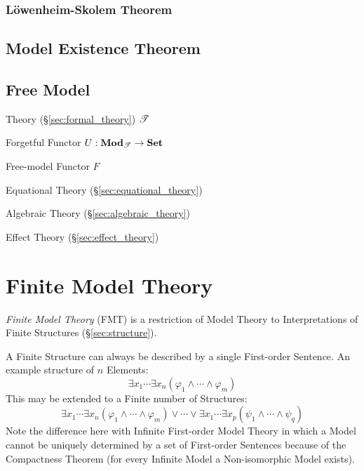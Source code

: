 \subsubsection{L\"owenheim-Skolem Theorem}\label{sec:lowenheim_skolem}



\subsection{Model Existence Theorem}\label{sec:model_existence}

\subsection{Free Model}\label{sec:free_model}

Theory (\S\ref{sec:formal_theory}) $\mathscr{T}$

Forgetful Functor $U : \mathbf{Mod}_\mathscr{T} \rightarrow \mathbf{Set}$

Free-model Functor $F$

Equational Theory (\S\ref{sec:equational_theory})

Algebraic Theory (\S\ref{sec:algebraic_theory})

Effect Theory (\S\ref{sec:effect_theory})



\section{Finite Model Theory}\label{sec:finite_model}

\emph{Finite Model Theory} (FMT) is a restriction of Model Theory to
Interpretations of Finite Structures (\S\ref{sec:structure}).

A Finite Structure can always be described by a single First-order
Sentence. An example structure of $n$ Elements:
\[
  \exists x_1 \cdots \exists x_n ( \varphi_1 \wedge \cdots \wedge
  \varphi_m )
\]
This may be extended to a Finite number of Structures:
\[
  \exists x_1 \cdots \exists x_n ( \varphi_1 \wedge \cdots \wedge
  \varphi_m )
  \vee
  \cdots
  \vee
  \exists x_1 \cdots \exists x_p ( \psi_1 \wedge \cdots \wedge
  \psi_q )
\]
Note the difference here with Infinite First-order Model Theory in
which a Model cannot be uniquely determined by a set of First-order
Sentences because of the Compactness Theorem (for every Infinite Model
a Non-isomorphic Model exists).

